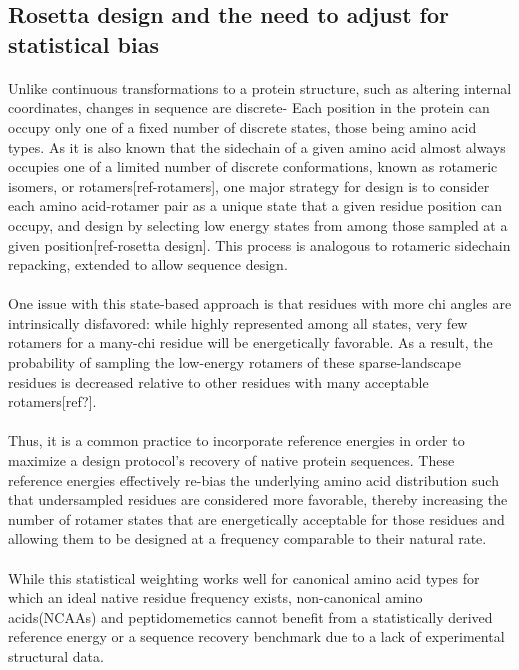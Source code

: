 \subsection{Rosetta design and the need to adjust for statistical bias}
\paragraph{}
Unlike continuous transformations to a protein structure, such as altering internal coordinates, changes in sequence are discrete- Each position in the protein can occupy only one of a fixed number of discrete states, those being amino acid types.
As it is also known that the sidechain of a given amino acid almost always occupies one of a limited number of discrete conformations, known as rotameric isomers, or rotamers[ref-rotamers], one major strategy for design is to consider each amino acid-rotamer pair as a unique state that a given residue position can occupy, and design by selecting low energy states from among those sampled at a given position[ref-rosetta design].
This process is analogous to rotameric sidechain repacking, extended to allow sequence design.

\paragraph{}
One issue with this state-based approach is that residues with more chi angles are intrinsically disfavored: while highly represented among all states, very few rotamers for a many-chi residue will be energetically favorable.
As a result, the probability of sampling the low-energy rotamers of these sparse-landscape residues is decreased relative to other residues with many acceptable rotamers[ref?].

\paragraph{}
Thus, it is a common practice to incorporate reference energies in order to maximize a design protocol's recovery of native protein sequences.
These reference energies effectively re-bias the underlying amino acid distribution such that undersampled residues are considered more favorable, thereby increasing the number of rotamer states that are energetically acceptable for those residues and allowing them to be designed at a frequency comparable to their natural rate. 

\paragraph{}
While this statistical weighting works well for canonical amino acid types for which an ideal native residue frequency exists, non-canonical amino acids(NCAAs) and peptidomemetics cannot benefit from a statistically derived reference energy or a sequence recovery benchmark due to a lack of experimental structural data.


